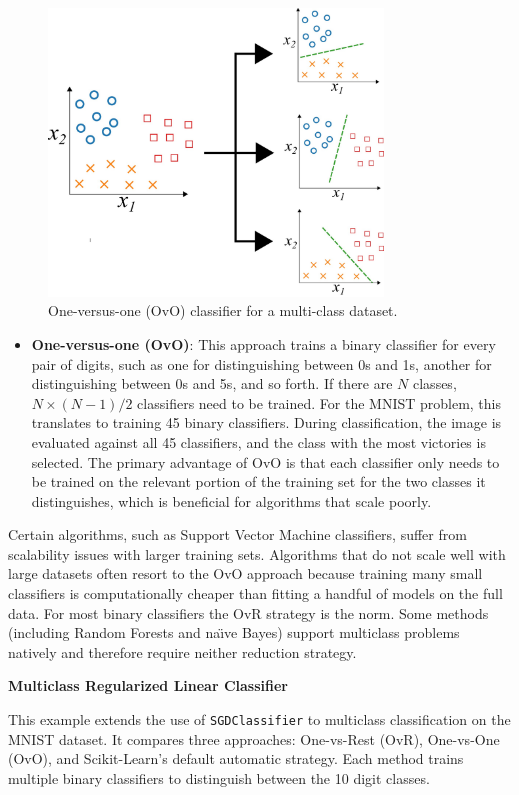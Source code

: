 \documentclass[12pt,letter]{article}
\begin{document}
\begin{figure}[H]
    \centering
    \includegraphics[width=3.5in]{../figures/one_vs_one}
    \caption{One-versus-one (OvO) classifier for a multi-class dataset.}
    \label{fig:one_vs_one}
\end{figure}

\begin{itemize}
\item \textbf{One-versus-one (OvO)}: This approach trains a binary classifier for every pair of digits, such as one for distinguishing between 0s and 1s, another for distinguishing between 0s and 5s, and so forth. If there are $N$ classes, $N \times (N - 1) / 2$ classifiers need to be trained. For the MNIST problem, this translates to training 45 binary classifiers. During classification, the image is evaluated against all 45 classifiers, and the class with the most victories is selected. The primary advantage of OvO is that each classifier only needs to be trained on the relevant portion of the training set for the two classes it distinguishes, which is beneficial for algorithms that scale poorly.
\end{itemize}




Certain algorithms, such as Support Vector Machine classifiers, suffer from scalability issues with larger training sets. Algorithms that do not scale well with large datasets often resort to the OvO approach because training many small classifiers is computationally cheaper than fitting a handful of models on the full data. For most binary classifiers the OvR strategy is the norm. Some methods (including Random Forests and na\"{\i}ve Bayes) support multiclass problems natively and therefore require neither reduction strategy.

\begin{example}
\textbf{Multiclass Regularized Linear Classifier}

\noindent This example extends the use of \texttt{SGDClassifier} to multiclass classification on the MNIST dataset. It compares three approaches: One-vs-Rest (OvR), One-vs-One (OvO), and Scikit-Learn's default automatic strategy. Each method trains multiple binary classifiers to distinguish between the 10 digit classes.
\end{example}
\end{document}
